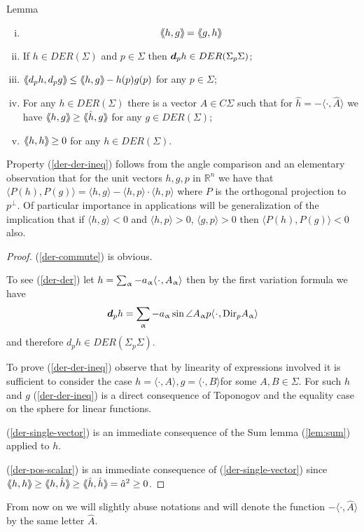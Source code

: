 \begin{thm}{Lemma}\label{der-prop}

\begin{enumerate}[(i)]
\item \label{der-commute}
\[
\hbox{$\langle\hskip-0.25em\langle$} h, g\hbox{$\rangle\hskip-0.25em\rangle\hskip-0.1em$}=\hbox{$\langle\hskip-0.25em\langle$} g, h\hbox{$\rangle\hskip-0.25em\rangle\hskip-0.1em$}
\]
\item \label{der-der} If $h\in DER(\Sigma)$ and $p\in \Sigma$ then $\d_ph\in DER(\Sigma_p\Sigma)$;
\item \label{der-der-ineq} $ \dlang d_ph,d_pg\drang\le \dlang h, g\drang-h(p)g(p)$ for any $p\in\Sigma$;
\item \label{der-single-vector} For any $h\in DER(\Sigma)$ there is a vector $\hat{A}\in C\Sigma$ such that for
 $\hat{h}=-\langle \cdot, \hat{A}\rangle$ we have $\dlang h, g\drang \ge \dlang \hat{h}, g\drang$ for any $g\in DER(\Sigma)$;
 \item \label{der-pos-scalar} $ \dlang h,h \drang\ge   0$ for any $h\in DER(\Sigma)$.
\end{enumerate}
\end{thm}
Property (\ref {der-der-ineq})  follows from the angle comparison and an elementary observation that
for the unit vectors $h,g,p$ in $\mathbb R^n$ we have that $\langle P(h),P(g)\rangle=\langle h,g\rangle-\langle h,p\rangle\cdot \langle h,p\rangle$ where $P$ is the orthogonal projection to $p^\perp$. Of particular importance in  applications will be generalization of  the implication that if $\langle h,g\rangle<0$ and $\langle h,p\rangle>0$, $\langle g,p\rangle>0$ then $\langle P(h),P(g)\rangle<0$ also.

\begin{proof}
(\ref{der-commute}) is obvious.

  To see (\ref{der-der})  let  $h=\sum_\a -a_\a\langle \cdot, {A_\a}\rangle$ then by the first variation formula we have
  \[\d_ph=\sum_\a -a_\a\sin \angle A_\a p \langle \cdot, \Dir{p}{A_\a}\rangle\]
and therefore $d_ph\in DER(\Sigma_p\Sigma)$.

To prove (\ref{der-der-ineq}) observe that  by linearity of expressions involved it is sufficient to consider the case $h= \langle \cdot, {A}\rangle, g= \langle \cdot, {B}\rangle$for some $A,B\in\Sigma$. For such $h$ and $g$   (\ref{der-der-ineq})  is a direct consequence of Toponogov and the equality case on the sphere for linear functions.

(\ref{der-single-vector}) is an immediate consequence of the  Sum lemma (\ref{lem:sum}) applied to $h$.

(\ref{der-pos-scalar})  is an immediate consequence of (\ref{der-single-vector}) since $ \dlang h,h \drang\ge  \dlang h,\hat h \drang  \ge \dlang \hat h,\hat h \drang={\hat a}^2\ge 0$.
\end{proof}
From now on we will slightly abuse notations and will denote the function $-\langle \cdot, \hat{A}\rangle$ by the same letter $\hat A$.
